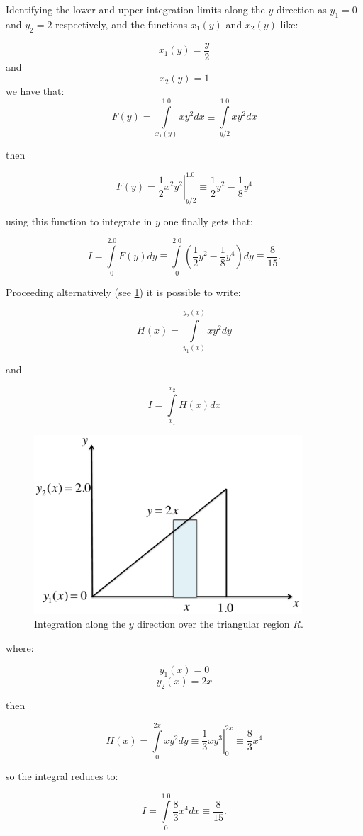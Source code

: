 Identifying the lower and upper integration limits along the $y$ direction as ${y_1} = 0$ and ${y_2} = 2$ respectively, and the functions ${{x_1}(y)}$ and ${{x_2}(y)}$ like:

\[x_1(y) = \frac{y}{2}\]
and
\[x_2(y) = 1\]
we have that:
\[F(y) = \int\limits_{{x_1}(y)}^{1.0} {x{y^2}dx}  \equiv \int\limits_{y/2}^{1.0} {x{y^2}dx} \]

then

\[F(y) = \left. {\frac{1}{2}{x^2}{y^2}} \right|_{y/2}^{1.0} \equiv \frac{1}{2}{y^2} - \frac{1}{8}{y^4}\]

using this function to integrate in $y$ one finally gets that:

\[I = \int\limits_0^{2.0} {F(y)dy}  \equiv \int\limits_0^{2.0} {(\frac{1}{2}{y^2} - \frac{1}{8}{y^4})dy}  \equiv \frac{8}{{15}}.\]


Proceeding alternatively (see \cref{fig:ejeinty}) it is possible to write:

\[H(x) = \int\limits_{{y_1}(x)}^{{y_2}(x)} {x{y^2}dy} \]

and

\[I = \int\limits_{{x_1}}^{{x_2}} {H(x)dx} \]

\begin{figure}[H]
\centering
\includegraphics[width=10cm]{img/ejeinty.pdf}
\caption{Integration along the $y$ direction over the triangular region $R$.}
\label{fig:ejeinty}
\end{figure}

where:

\[{y_1}(x) = 0\]
\[{y_2}(x) = 2x\]

then

\[H(x) = \int\limits_0^{2x} {x{y^2}dy}  \equiv \left. {\frac{1}{3}x{y^3}} \right|_0^{2x} \equiv \frac{8}{3}{x^4}\]

so the integral reduces to:

\[I = \int\limits_0^{1.0} {\frac{8}{3}{x^4}dx}  \equiv \frac{8}{{15}}.\]

